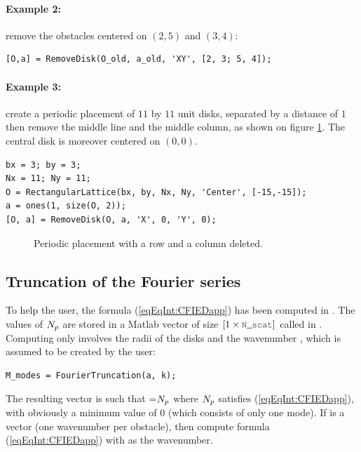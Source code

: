 \paragraph{Example 2:} remove the obstacles centered on $(2,5)$ and $(3,4)$:
\begin{lstlisting}
[O,a] = RemoveDisk(O_old, a_old, 'XY', [2, 3; 5, 4]);
\end{lstlisting}
\paragraph{Example 3:} create a periodic placement of $11$ by $11$ unit disks, separated by a distance of $1$ then remove the middle line and the middle column, as shown on figure \ref{fig:removeDisks}. The central disk is moreover centered on $(0,0)$.
\begin{lstlisting}
bx = 3; by = 3;
Nx = 11; Ny = 11;
O = RectangularLattice(bx, by, Nx, Ny, 'Center', [-15,-15]);
a = ones(1, size(O, 2));
[O, a] = RemoveDisk(O, a, 'X', 0, 'Y', 0);
\end{lstlisting}

\begin{figure}
\centering
{}
\caption{Periodic placement with a row and a column deleted.}
\label{fig:removeDisks}
\end{figure}



\subsection{Truncation of the Fourier series}

To help the user, the formula (\ref{eqEqInt:CFIEDapp}) has been computed in \mudiff. The values of $N_{p}$ are stored in a Matlab vector of size $[1\times\code{N\_scat}]$ called  in \mudiff. Computing  only involves the radii of the disks and the wavenumber , which is assumed to be created by the user:
\begin{lstlisting}
M_modes = FourierTruncation(a, k);
\end{lstlisting}
The resulting vector is such that =$N_{p}$ where $N_{p}$ satisfies (\ref{eqEqInt:CFIEDapp}), with obviously a minimum value of $0$ (which consists of only one mode). If  is a vector (one wavenumber per obstacle), then  compute formula (\ref{eqEqInt:CFIEDapp})  with  as the wavenumber.

